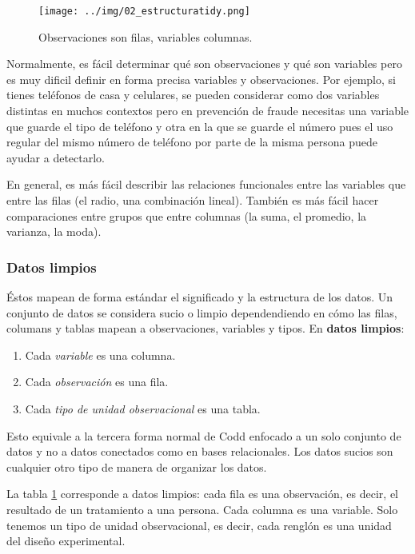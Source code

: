 \documentclass[]{article}
\begin{document}
\begin{figure}[h]
    \centering
    \texttt{[image: ../img/02\_estructuratidy.png]}
    \caption{Observaciones son filas, variables columnas.}
    \label{fig:estructuratidy}
\end{figure}

Normalmente, es fácil determinar qué son observaciones y qué son
variables pero es muy dificil definir en forma precisa variables y
observaciones. Por ejemplo, si tienes teléfonos de casa y celulares, se
pueden considerar como dos variables distintas en muchos contextos pero
en prevención de fraude necesitas una variable que guarde el tipo de
teléfono y otra en la que se guarde el número pues el uso regular del
mismo número de teléfono por parte de la misma persona puede ayudar a
detectarlo.

En general, es más fácil describir las relaciones funcionales entre las
variables que entre las filas (el radio, una combinación lineal).
También es más fácil hacer comparaciones entre grupos que entre columnas
(la suma, el promedio, la varianza, la moda).

\subsubsection{Datos limpios}\label{datos-limpios-1}

Éstos mapean de forma estándar el significado y la estructura de los
datos. Un conjunto de datos se considera sucio o limpio dependendiendo
en cómo las filas, columans y tablas mapean a observaciones, variables y
tipos. En \textbf{datos limpios}:

\begin{enumerate}
\def\labelenumi{\arabic{enumi}.}
\itemsep1pt\parskip0pt
\item
  Cada \emph{variable} es una columna.
\item
  Cada \emph{observación} es una fila.
\item
  Cada \emph{tipo de unidad observacional} es una tabla.
\end{enumerate}

Esto equivale a la tercera forma normal de Codd enfocado a un solo
conjunto de datos y no a datos conectados como en bases relacionales.
Los datos sucios son cualquier otro tipo de manera de organizar los
datos.

La tabla \ref{fig:estructuratidy} corresponde a datos limpios: cada fila
es una observación, es decir, el resultado de un tratamiento a una
persona. Cada columna es una variable. Solo tenemos un tipo de unidad
observacional, es decir, cada renglón es una unidad del diseño
experimental.
\end{document}
